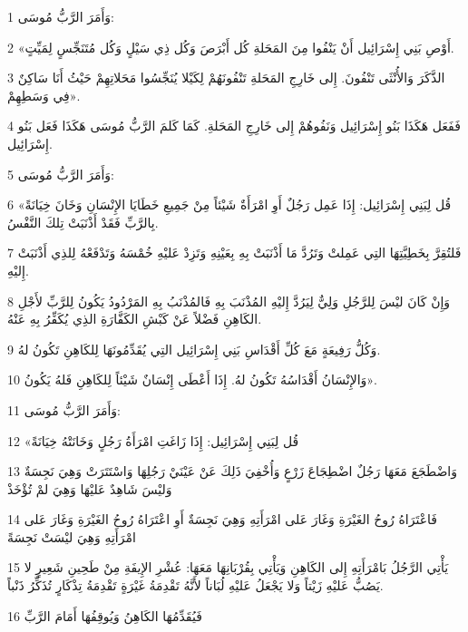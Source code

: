 \par 1 وَأَمَرَ الرَّبُّ مُوسَى:
\par 2 «أَوْصِ بَنِي إِسْرَائِيل أَنْ يَنْفُوا مِنَ المَحَلةِ كُل أَبْرَصَ وَكُل ذِي سَيْلٍ وَكُل مُتَنَجِّسٍ لِمَيِّتٍ.
\par 3 الذَّكَرَ وَالأُنْثَى تَنْفُونَ. إِلى خَارِجِ المَحَلةِ تَنْفُونَهُمْ لِكَيْلا يُنَجِّسُوا مَحَلاتِهِمْ حَيْثُ أَنَا سَاكِنٌ فِي وَسَطِهِمْ».
\par 4 فَفَعَل هَكَذَا بَنُو إِسْرَائِيل وَنَفُوهُمْ إِلى خَارِجِ المَحَلةِ. كَمَا كَلمَ الرَّبُّ مُوسَى هَكَذَا فَعَل بَنُو إِسْرَائِيل.
\par 5 وَأَمَرَ الرَّبُّ مُوسَى:
\par 6 «قُل لِبَنِي إِسْرَائِيل: إِذَا عَمِل رَجُلٌ أَوِ امْرَأَةٌ شَيْئاً مِنْ جَمِيعِ خَطَايَا الإِنْسَانِ وَخَانَ خِيَانَةً بِالرَّبِّ فَقَدْ أَذْنَبَتْ تِلكَ النَّفْسُ.
\par 7 فَلتُقِرَّ بِخَطِيَّتِهَا التِي عَمِلتْ وَتَرُدَّ مَا أَذْنَبَتْ بِهِ بِعَيْنِهِ وَتَزِدْ عَليْهِ خُمْسَهُ وَتَدْفَعْهُ لِلذِي أَذْنَبَتْ إِليْهِ.
\par 8 وَإِنْ كَانَ ليْسَ لِلرَّجُلِ وَلِيٌّ لِيَرُدَّ إِليْهِ المُذْنَبَ بِهِ فَالمُذْنَبُ بِهِ المَرْدُودُ يَكُونُ لِلرَّبِّ لأَجْلِ الكَاهِنِ فَضْلاً عَنْ كَبْشِ الكَفَّارَةِ الذِي يُكَفِّرُ بِهِ عَنْهُ.
\par 9 وَكُلُّ رَفِيعَةٍ مَعَ كُلِّ أَقْدَاسِ بَنِي إِسْرَائِيل التِي يُقَدِّمُونَهَا لِلكَاهِنِ تَكُونُ لهُ.
\par 10 وَالإِنْسَانُ أَقْدَاسُهُ تَكُونُ لهُ. إِذَا أَعْطَى إِنْسَانٌ شَيْئاً لِلكَاهِنِ فَلهُ يَكُونُ».
\par 11 وَأَمَرَ الرَّبُّ مُوسَى:
\par 12 «قُل لِبَنِي إِسْرَائِيل: إِذَا زَاغَتِ امْرَأَةُ رَجُلٍ وَخَانَتْهُ خِيَانَةً
\par 13 وَاضْطَجَعَ مَعَهَا رَجُلٌ اضْطِجَاعَ زَرْعٍ وَأُخْفِيَ ذَلِكَ عَنْ عَيْنَيْ رَجُلِهَا وَاسْتَتَرَتْ وَهِيَ نَجِسَةٌ وَليْسَ شَاهِدٌ عَليْهَا وَهِيَ لمْ تُؤْخَذْ
\par 14 فَاعْتَرَاهُ رُوحُ الغَيْرَةِ وَغَارَ عَلى امْرَأَتِهِ وَهِيَ نَجِسَةٌ أَوِ اعْتَرَاهُ رُوحُ الغَيْرَةِ وَغَارَ عَلى امْرَأَتِهِ وَهِيَ ليْسَتْ نَجِسَةً
\par 15 يَأْتِي الرَّجُلُ بَامْرَأَتِهِ إِلى الكَاهِنِ وَيَأْتِي بِقُرْبَانِهَا مَعَهَا: عُشْرِ الإِيفَةِ مِنْ طَحِينِ شَعِيرٍ لا يَصُبُّ عَليْهِ زَيْتاً وَلا يَجْعَلُ عَليْهِ لُبَاناً لأَنَّهُ تَقْدِمَةُ غَيْرَةٍ تَقْدِمَةُ تِذْكَارٍ تُذَكِّرُ ذَنْباً.
\par 16 فَيُقَدِّمُهَا الكَاهِنُ وَيُوقِفُهَا أَمَامَ الرَّبِّ
